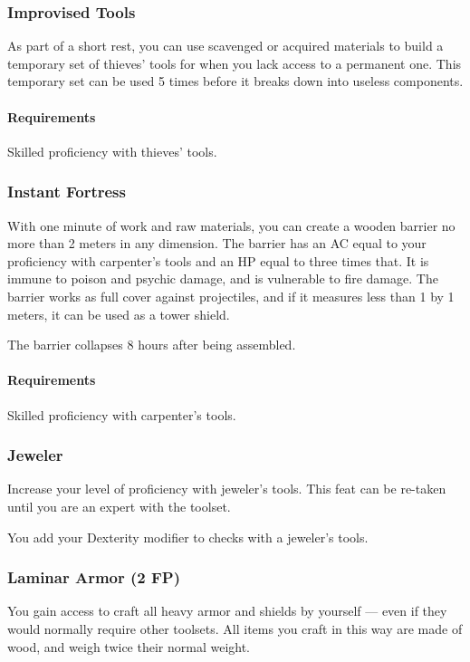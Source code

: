 \subsubsection{Improvised Tools} \label{feat::improvisedtools}
    As part of a short rest, you can use scavenged or acquired materials to build a temporary set of thieves' tools for when you lack access to a permanent one.
    This temporary set can be used 5 times before it breaks down into useless components.
    \paragraph{Requirements} Skilled proficiency with thieves' tools.
\subsubsection{Instant Fortress} \label{feat::instantfortress}
    With one minute of work and raw materials, you can create a wooden barrier no more than 2 meters in any dimension.
    The barrier has an AC equal to your proficiency with carpenter's tools and an HP equal to three times that.
    It is immune to poison and psychic damage, and is vulnerable to fire damage.
    The barrier works as full cover against projectiles, and if it measures less than 1 by 1 meters, it can be used as a tower shield.

    The barrier collapses 8 hours after being assembled.
    \paragraph{Requirements} Skilled proficiency with carpenter's tools.
\subsubsection{Jeweler} \label{feat::jeweler}
    Increase your level of proficiency with jeweler's tools.
    This feat can be re-taken until you are an expert with the toolset.

    You add your Dexterity modifier to checks with a jeweler's tools.
\subsubsection{Laminar Armor (2 FP)} \label{feat::laminararmor}
    You gain access to craft all heavy armor and shields by yourself --- even if they would normally require other toolsets.
    All items you craft in this way are made of wood, and weigh twice their normal weight.

